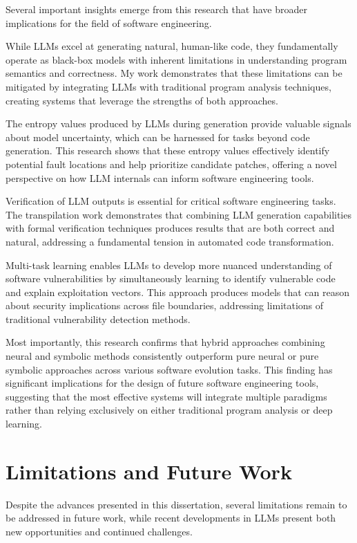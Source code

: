 Several important insights emerge from this research that have broader implications for the field of software engineering.

While LLMs excel at generating natural, human-like code, they fundamentally operate as black-box models with inherent limitations in understanding program semantics and correctness. My work demonstrates that these limitations can be mitigated by integrating LLMs with traditional program analysis techniques, creating systems that leverage the strengths of both approaches.

The entropy values produced by LLMs during generation provide valuable signals about model uncertainty, which can be harnessed for tasks beyond code generation. This research shows that these entropy values effectively identify potential fault locations and help prioritize candidate patches, offering a novel perspective on how LLM internals can inform software engineering tools.

Verification of LLM outputs is essential for critical software engineering tasks. The transpilation work demonstrates that combining LLM generation capabilities with formal verification techniques produces results that are both correct and natural, addressing a fundamental tension in automated code transformation.

Multi-task learning enables LLMs to develop more nuanced understanding of software vulnerabilities by simultaneously learning to identify vulnerable code and explain exploitation vectors. This approach produces models that can reason about security implications across file boundaries, addressing limitations of traditional vulnerability detection methods.

Most importantly, this research confirms that hybrid approaches combining neural and symbolic methods consistently outperform pure neural or pure symbolic approaches across various software evolution tasks. This finding has significant implications for the design of future software engineering tools, suggesting that the most effective systems will integrate multiple paradigms rather than relying exclusively on either traditional program analysis or deep learning.

\section{Limitations and Future Work}

Despite the advances presented in this dissertation, several limitations remain to be addressed in future work, while recent developments in LLMs present both new opportunities and continued challenges.

